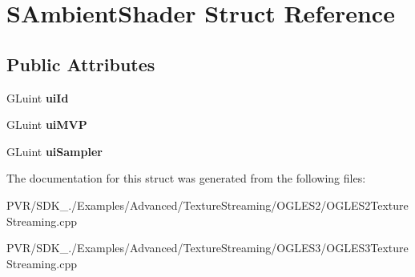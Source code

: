 \hypertarget{struct_s_ambient_shader}{\section{S\+Ambient\+Shader Struct Reference}
\label{struct_s_ambient_shader}
}
\subsection*{Public Attributes}
\begin{DoxyCompactItemize}
\item 
\hypertarget{struct_s_ambient_shader_a102f2c9b2e5141c1aef7b322694d1c71}{G\+Luint {\bfseries ui\+Id}}\label{struct_s_ambient_shader_a102f2c9b2e5141c1aef7b322694d1c71}

\item 
\hypertarget{struct_s_ambient_shader_aa47ebb309985487b5bd47647fd2a956f}{G\+Luint {\bfseries ui\+M\+V\+P}}\label{struct_s_ambient_shader_aa47ebb309985487b5bd47647fd2a956f}

\item 
\hypertarget{struct_s_ambient_shader_aa7d6278b209d0180644817d8d7461df2}{G\+Luint {\bfseries ui\+Sampler}}\label{struct_s_ambient_shader_aa7d6278b209d0180644817d8d7461df2}

\end{DoxyCompactItemize}


The documentation for this struct was generated from the following files\+:\begin{DoxyCompactItemize}
\item 
P\+V\+R/\+S\+D\+K\+\_./\+Examples/\+Advanced/\+Texture\+Streaming/\+O\+G\+L\+E\+S2/O\+G\+L\+E\+S2\+Texture\+Streaming.\+cpp\item 
P\+V\+R/\+S\+D\+K\+\_./\+Examples/\+Advanced/\+Texture\+Streaming/\+O\+G\+L\+E\+S3/O\+G\+L\+E\+S3\+Texture\+Streaming.\+cpp\end{DoxyCompactItemize}
